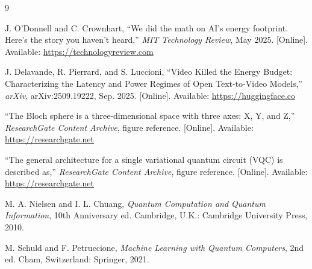 \documentclass[12pt]{article}
\begin{document}
\newpage
\begin{thebibliography}{9}

J. O'Donnell and C. Crownhart, ``We did the math on AI's energy footprint. Here's the story you haven't heard,'' \textit{MIT Technology Review}, May 2025. [Online]. Available: \url{https://technologyreview.com}

J. Delavande, R. Pierrard, and S. Luccioni, ``Video Killed the Energy Budget: Characterizing the Latency and Power Regimes of Open Text-to-Video Models,'' \textit{arXiv}, arXiv:2509.19222, Sep. 2025. [Online]. Available: \url{https://huggingface.co}

``The Bloch sphere is a three-dimensional space with three axes: X, Y, and Z,'' \textit{ResearchGate Content Archive}, figure reference. [Online]. Available: \url{https://researchgate.net}

``The general architecture for a single variational quantum circuit (VQC) is described as,'' \textit{ResearchGate Content Archive}, figure reference. [Online]. Available: \url{https://researchgate.net}

M. A. Nielsen and I. L. Chuang, \textit{Quantum Computation and Quantum Information}, 10th Anniversary ed. Cambridge, U.K.: Cambridge University Press, 2010.

M. Schuld and F. Petruccione, \textit{Machine Learning with Quantum Computers}, 2nd ed. Cham, Switzerland: Springer, 2021.

\end{thebibliography}
\end{document}
